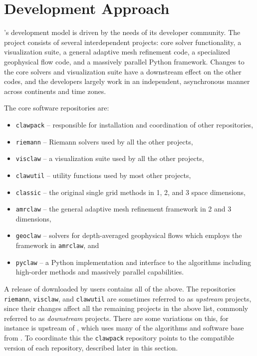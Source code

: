 %
%
%

\section{Development Approach} \label{sec:development}

\clawpack's development model is driven by the needs of its
developer community.  The \clawpack project consists of several
interdependent projects: core solver functionality, a
visualization suite, a general adaptive mesh refinement code, a
specialized geophysical flow code, and a massively parallel Python
framework.  Changes to the core solvers and visualization suite have a
downstream effect on the other codes, and the developers largely work
in an independent, asynchronous manner across continents and time
zones.

\vskip 5pt
The core \clawpack software repositories are:
\begin{itemize}
    \item \texttt{clawpack} -- responsible for installation and coordination of
    other repositories,
    \item \texttt{riemann} -- Riemann solvers used by all the other
    projects,
    \item \texttt{visclaw} -- a visualization suite used by all the other
    projects,
    \item \texttt{clawutil} -- utility functions used by most other
    projects,
    \item \texttt{classic} -- the original single grid methods in 1, 2, and 3
    space dimensions,
    \item \texttt{amrclaw} -- the general adaptive mesh refinement
    framework in 2 and 3 dimensions,
    \item \texttt{geoclaw} -- solvers for depth-averaged
    geophysical flows which employs the framework in \texttt{amrclaw}, and
    \item \texttt{pyclaw} -- a Python implementation and interface to the
    \clawpack algorithms including high-order methods and massively
    parallel capabilities.
\end{itemize}

\noindent
A release of \clawpack downloaded by users contains all of the above.
The repositories \texttt{riemann}, \texttt{visclaw}, and
\texttt{clawutil} are sometimes referred to as \textit{upstream}
projects, since their changes affect all the remaining projects in the
above list, commonly referred to as \textit{downstream} projects.
There are some variations on this, for instance \amrclaw is upstream
of \geoclaw, which uses many of the algorithms and software base from
\amrclaw.  To coordinate this the \texttt{clawpack} repository
points to the compatible version of each repository, described later
in this section.

